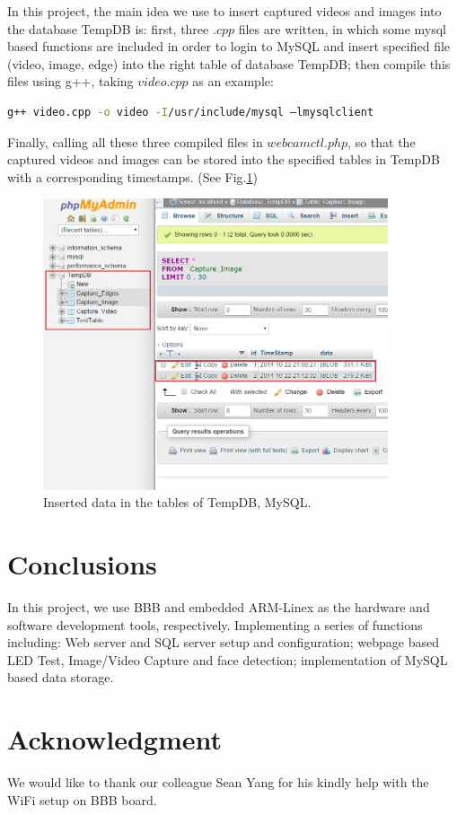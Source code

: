 \documentclass[12pt,journal,draftclsnofoot,onecolumn]{IEEEtran}
\begin{document}
In this project, the main idea we use to insert captured videos and images into the database TempDB is: first, three $.cpp$ files are written, in which some mysql based functions are included in order to login to MySQL and insert specified file (video, image, edge) into the right table of database TempDB; then compile this files using g++, taking $video.cpp$ as an example:
\begin{lstlisting}[language={bash}]
g++ video.cpp -o video -I/usr/include/mysql –lmysqlclient
\end{lstlisting}
Finally, calling all these three compiled files in $webcamctl.php$, so that the captured videos and images can be stored into the specified tables in TempDB with a corresponding timestamps. (See Fig.\ref{sql2})
\begin{figure}[ht]
	\centering
	\includegraphics[width=4in]{./figs/sql2.jpg}
	\caption{Inserted data in the tables of TempDB, MySQL.}
	\label{sql2}
\end{figure}
\section{Conclusions}\label{Con}
In this project, we use BBB and embedded ARM-Linex as the hardware and software development tools, respectively. Implementing a series of functions including: Web server and SQL server setup and configuration; webpage based LED Test, Image/Video Capture and face detection; implementation of MySQL based data storage.

\section*{Acknowledgment}
We would like to thank our colleague Sean Yang  for his kindly help with the WiFi setup on BBB board.



\end{document}
